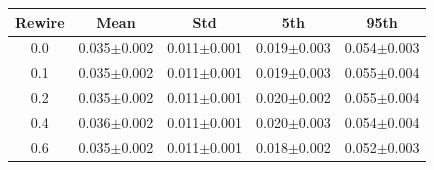 \begin{tabular}{@{}ccccc@{}}
\toprule
Rewire & Mean & Std & 5th & 95th \\
\midrule
0.0 & 0.035$\pm$0.002 & 0.011$\pm$0.001 & 0.019$\pm$0.003 & 0.054$\pm$0.003 \\
0.1 & 0.035$\pm$0.002 & 0.011$\pm$0.001 & 0.019$\pm$0.003 & 0.055$\pm$0.004 \\
0.2 & 0.035$\pm$0.002 & 0.011$\pm$0.001 & 0.020$\pm$0.002 & 0.055$\pm$0.004 \\
0.4 & 0.036$\pm$0.002 & 0.011$\pm$0.001 & 0.020$\pm$0.003 & 0.054$\pm$0.004 \\
0.6 & 0.035$\pm$0.002 & 0.011$\pm$0.001 & 0.018$\pm$0.002 & 0.052$\pm$0.003 \\
\bottomrule
\end{tabular}

